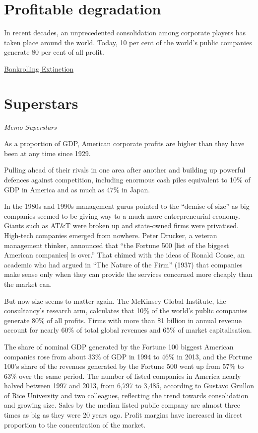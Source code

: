 \documentclass[
]{book}
\begin{document}
\hypertarget{profitable-degradation}{%
\section{Profitable degradation}\label{profitable-degradation}}

In recent decades, an unprecedented
consolidation among corporate players has
taken place around the world. Today, 10 per
cent of the world's public companies generate
80 per cent of all profit.

\href{https://portfolio.earth/campaigns/bankrolling-extinction/}{Bankrolling Extinction}

\hypertarget{superstars}{%
\section{Superstars}\label{superstars}}

\emph{Memo Superstars}

As a proportion of GDP, American corporate profits are higher
than they have been at any time since 1929.

Pulling ahead of their rivals in one area after another and building up powerful defences against competition, including enormous cash piles equivalent to 10\% of GDP in America and as much as 47\% in Japan.

In the 1980s and 1990s management gurus pointed to the ``demise of size'' as big companies seemed to be giving way to a much more entrepreneurial economy.
Giants such as AT\&T were broken up and state-owned firms were privatised. High-tech companies emerged from nowhere. Peter Drucker, a veteran management thinker, announced that ``the Fortune 500 {[}list of the biggest American companies{]} is over.'' That chimed with the ideas of Ronald Coase, an academic who had argued in ``The Nature of the Firm'' (1937) that companies make sense only when they can provide the services concerned more cheaply than the market can.

But now size seems to matter again. The McKinsey Global Institute, the consultancy's research arm, calculates that 10\% of the world's public companies generate 80\% of all profits.
Firms with more than \$1 billion in annual revenue account for nearly 60\% of total global revenues and 65\% of market capitalisation.

The share of nominal GDP generated by the Fortune 100 biggest American companies rose from about 33\% of GDP in 1994 to 46\% in 2013, and the Fortune 100's share of the revenues generated by the Fortune 500 went up from 57\% to 63\% over the same period. The number of listed companies in America nearly halved between 1997 and 2013, from 6,797 to 3,485, according to Gustavo Grullon of Rice University and two colleagues, reflecting the trend towards consolidation and growing size. Sales by the median listed public company are almost three times as big as they were 20 years ago. Profit margins have increased in direct proportion to the concentration of the market.
\end{document}
